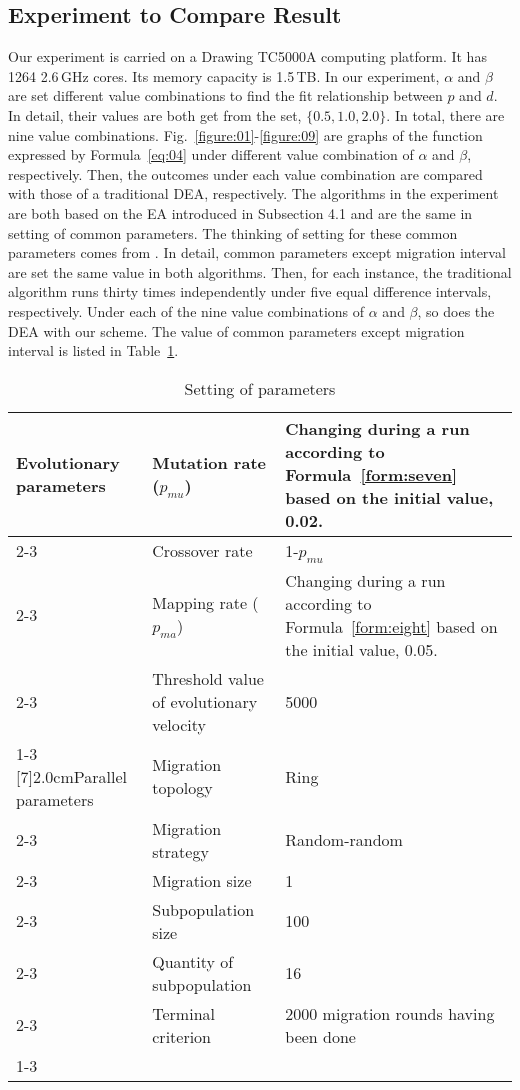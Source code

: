 \documentclass[journal,onecolumn]{IEEEtran}
\begin{document}
\subsection{Experiment to Compare Result}
%
Our experiment is carried on a Drawing TC5000A computing platform.
It has 1264 2.6\,GHz cores.
Its memory capacity is 1.5\,TB.
In our experiment, $\alpha$ and $\beta$ are set different value combinations to find the fit relationship between $p$ and $d$.
In detail, their values are both get from the set, $\{0.5,1.0,2.0\}$.
In total, there are nine value combinations.
Fig.~\ref{figure:01}-\ref{figure:09} are graphs of the function expressed by Formula~\ref{eq:04} under different value combination of $\alpha$ and $\beta$, respectively.
Then, the outcomes under each value combination are compared with those of a traditional DEA, respectively.
The algorithms in the experiment are both based on the EA introduced in Subsection 4.1 and are the same in setting of common parameters.
The thinking of setting for these common parameters comes from \cite{li2014global}.
In detail, common parameters except migration interval are set the same value in both algorithms.
Then, for each instance, the traditional algorithm runs thirty times independently under five equal difference intervals, respectively.
Under each of the nine value combinations of $\alpha$ and $\beta$, so does the DEA with our scheme.
The value of common parameters except migration interval is listed in Table~\ref{table:01}.
\begin{table}[!htbp]
  \caption{Setting of parameters}
  \centering
  \label{table:01}
  \begin{tabular}{|m{1.4cm}<{\centering}|m{2.5cm} <{\centering}|m{3.6cm}|}
  \hline
  \multirow{4}[20]{2.0cm}{Evolutionary parameters}
          & Mutation rate ($p_{mu}$) & Changing during a run according to Formula~\ref{form:seven} based on the initial value, 0.02.  \\ \cline{2-3}
          & Crossover rate      & 1-$p_{mu}$  \\ \cline{2-3}
          & Mapping rate ($p_{ma}$)   & Changing during a run according to Formula~\ref{form:eight} based on the initial value, 0.05.  \\ \cline{2-3}
          & Threshold value of evolutionary velocity & 5000 \\ \cline{1-3}
           \hline
  \multirow{6}[7]{2.0cm}{Parallel parameters}
          & Migration topology  & Ring  \\ \cline{2-3}
          & Migration strategy  & Random-random  \\ \cline{2-3}
          & Migration size      & 1      \\ \cline{2-3}
          & Subpopulation size  & 100     \\ \cline{2-3}
          & Quantity of subpopulation & 16 \\ \cline{2-3}
          & Terminal criterion & 2000 migration rounds having been done \\
          \cline{1-3}
  \end{tabular}
\end{table}
\end{document}
